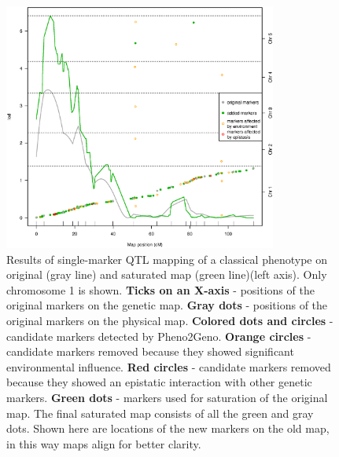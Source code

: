 \begin{figure}[h!]
  \centering
  \includegraphics[keepaspectratio,width=0.8\textwidth]{eps/image_2_2.eps}
  \caption[single-marker QTL mapping]{Results of single-marker QTL mapping of a classical phenotype on original (gray line) and saturated map (green line)(left axis). 
          Only chromosome 1 is shown.
          {\bf Ticks on an X-axis} - positions of the original markers on the genetic map. 
          {\bf Gray dots} - positions of the original markers on the physical map. 
          {\bf Colored dots and circles} - candidate markers detected by Pheno2Geno.
          {\bf Orange circles} - candidate markers removed because they showed significant environmental influence.
          {\bf Red circles} - candidate markers removed because they showed an epistatic interaction with other genetic markers. 
          {\bf Green dots} - markers used for saturation of the original map. 
          The final saturated map consists of all the green and gray dots. Shown here are locations of the new markers on the old map, in 
          this way maps align for better clarity.}
          \label{fig:qtlcomparison}
\end{figure}

